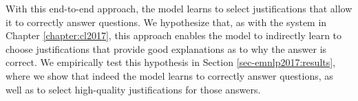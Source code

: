 
With this end-to-end approach, the model learns to select justifications that allow it to correctly answer questions.  We hypothesize that, as with the system in Chapter \ref{chapter:cl2017}, this approach enables the model to indirectly learn to choose justifications that provide good explanations as to why the answer is correct. We empirically test this hypothesis in Section \ref{sec-emnlp2017:results}, where we show that indeed the model learns to correctly answer questions, as well as to select high-quality justifications for those answers. 
